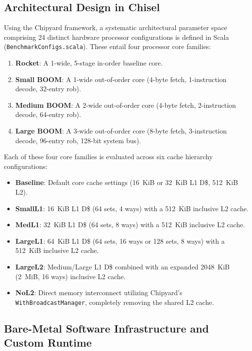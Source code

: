 \subsection{Architectural Design in Chisel}
Using the Chipyard framework, a systematic architectural parameter space comprising 24 distinct hardware processor configurations is defined in Scala (\texttt{BenchmarkConfigs.scala}). 
These entail four processor core families:
\begin{enumerate}
    \item \textbf{Rocket}: A 1-wide, 5-stage in-order baseline core.
    \item \textbf{Small BOOM}: A 1-wide out-of-order core (4-byte fetch, 1-instruction decode, 32-entry \gls{rob}).
    \item \textbf{Medium BOOM}: A 2-wide out-of-order core (4-byte fetch, 2-instruction decode, 64-entry \gls{rob}).
    \item \textbf{Large BOOM}: A 3-wide out-of-order core (8-byte fetch, 3-instruction decode, 96-entry \gls{rob}, 128-bit system bus).
\end{enumerate}

Each of these four core families is evaluated across six cache hierarchy configurations:

\begin{itemize}
    \item \textbf{Baseline}: Default core cache settings (16~KiB or 32~KiB L1 D\$, 512~KiB L2).
    \item \textbf{SmallL1}: 16~KiB L1 D\$ (64 sets, 4 ways) with a 512~KiB inclusive L2 cache.
    \item \textbf{MedL1}: 32~KiB L1 D\$ (64 sets, 8 ways) with a 512~KiB inclusive L2 cache.
    \item \textbf{LargeL1}: 64~KiB L1 D\$ (64 sets, 16 ways or 128 sets, 8 ways) with a 512~KiB inclusive L2 cache.
    \item \textbf{LargeL2}: Medium/Large L1 D\$ combined with an expanded 2048~KiB (2~MiB, 16 ways) inclusive L2 cache.
    \item \textbf{NoL2}: Direct memory interconnect utilizing Chipyard's \texttt{WithBroadcastManager}, completely removing the shared L2 cache.
\end{itemize}

\subsection{Bare-Metal Software Infrastructure and Custom Runtime}

